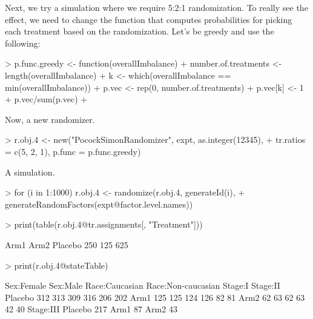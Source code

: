 \documentclass[11pt, letter]{article}
\numberwithin{equation}{section}
\begin{document}
Next, we try a simulation where we require 5:2:1 randomization. To
really see the effect, we need to change the function that computes
probabilities for picking each treatment based on the
randomization. Let's be greedy and use the following:

\begin{Schunk}
\begin{Sinput}
> p.func.greedy <- function(overallImbalance) {
+     number.of.treatments <- length(overallImbalance)
+     k <- which(overallImbalance == min(overallImbalance))
+     p.vec <- rep(0, number.of.treatments)
+     p.vec[k] <- 1
+     p.vec/sum(p.vec)
+ }
\end{Sinput}
\end{Schunk}

Now, a new randomizer.

\begin{Schunk}
\begin{Sinput}
> r.obj.4 <- new("PocockSimonRandomizer", expt, as.integer(12345), 
+     tr.ratios = c(5, 2, 1), p.func = p.func.greedy)
\end{Sinput}
\end{Schunk}

A simulation.

\begin{Schunk}
\begin{Sinput}
> for (i in 1:1000) r.obj.4 <- randomize(r.obj.4, generateId(i), 
+     generateRandomFactors(expt@factor.level.names))
\end{Sinput}
\end{Schunk}

\begin{Schunk}
\begin{Sinput}
> print(table(r.obj.4@tr.assignments[, "Treatment"]))
\end{Sinput}
\begin{Soutput}
   Arm1    Arm2 Placebo 
    250     125     625 
\end{Soutput}
\begin{Sinput}
> print(r.obj.4@stateTable)
\end{Sinput}
\begin{Soutput}
        Sex:Female Sex:Male Race:Caucasian Race:Non-caucasian Stage:I Stage:II
Placebo        312      313            309                316     206      202
Arm1           125      125            124                126      82       81
Arm2            62       63             62                 63      42       40
        Stage:III
Placebo       217
Arm1           87
Arm2           43
\end{Soutput}
\end{Schunk}
\end{document}
